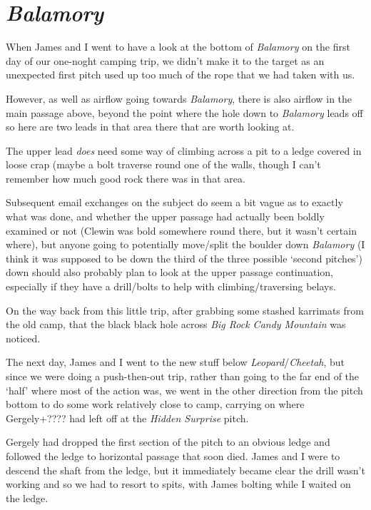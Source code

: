 
\hypertarget{balamory}{%
\section{\texorpdfstring{\emph{Balamory}}{Balamory}}\label{balamory}}

When James and I went to have a look at the bottom of \emph{Balamory} on
the first day of our one-noght camping trip, we didn't make it to the
target as an unexpected first pitch used up too much of the rope that we
had taken with us.

However, as well as airflow going towards \emph{Balamory}, there is also
airflow in the main passage above, beyond the point where the hole down
to \emph{Balamory} leads off so here are two leads in that area there
that are worth looking at.

The upper lead \emph{does} need some way of climbing across a pit to a
ledge covered in loose crap (maybe a bolt traverse round one of the
walls, though I can't remember how much good rock there was in that
area.

Subsequent email exchanges on the subject do seem a bit vague as to
exactly what was done, and whether the upper passage had actually been
boldly examined or not (Clewin was bold somewhere round there, but it
wasn't certain where), but anyone going to potentially move/split the
boulder down \emph{Balamory} (I think it was supposed to be down the
third of the three possible `second pitches') down should also probably
plan to look at the upper passage continuation, especially if they have
a drill/bolts to help with climbing/traversing belays.

On the way back from this little trip, after grabbing some stashed
karrimats from the old camp, that the black black hole across \emph{Big
Rock Candy Mountain} was noticed.

The next day, James and I went to the new stuff below
\emph{Leopard}/\emph{Cheetah}, but since we were doing a push-then-out
trip, rather than going to the far end of the `half' where most of the
action was, we went in the other direction from the pitch bottom to do
some work relatively close to camp, carrying on where Gergely+???? had
left off at the \emph{Hidden Surprise} pitch.

Gergely had dropped the first section of the pitch to an obvious ledge
and followed the ledge to horizontal passage that soon died. James and I
were to descend the shaft from the ledge, but it immediately became
clear the drill wasn't working and so we had to resort to spits, with
James bolting while I waited on the ledge.

